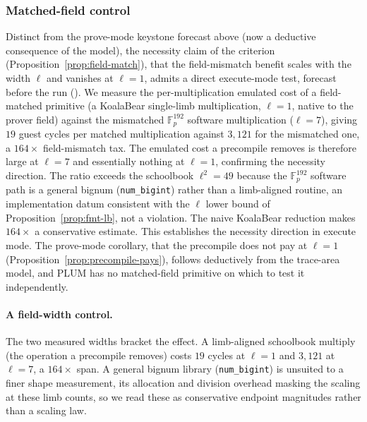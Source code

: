 \subsubsection{Matched-field control}
Distinct from the prove-mode keystone forecast above (now a deductive consequence of the model), the necessity claim of the criterion (Proposition~\ref{prop:field-match}), that the field-mismatch benefit scales with the width $\ell$ and vanishes at $\ell=1$, admits a direct execute-mode test, forecast before the run (). We measure the per-multiplication emulated cost of a field-matched primitive (a KoalaBear single-limb multiplication, $\ell=1$, native to the prover field) against the mismatched $\mathbb{F}_p^{192}$ software multiplication ($\ell=7$), giving $19$ guest cycles per matched multiplication against $3{,}121$ for the mismatched one, a $164\times$ field-mismatch tax. The emulated cost a precompile removes is therefore large at $\ell=7$ and essentially nothing at $\ell=1$, confirming the necessity direction. The ratio exceeds the schoolbook $\ell^2=49$ because the $\mathbb{F}_p^{192}$ software path is a general bignum (\texttt{num\_bigint}) rather than a limb-aligned routine, an implementation datum consistent with the $\ell$ lower bound of Proposition~\ref{prop:fmt-lb}, not a violation. The naive KoalaBear reduction makes $164\times$ a conservative estimate. This establishes the necessity direction in execute mode. The prove-mode corollary, that the precompile does not pay at $\ell=1$ (Proposition~\ref{prop:precompile-pays}), follows deductively from the trace-area model, and PLUM has no matched-field primitive on which to test it independently.

\paragraph{A field-width control.} The two measured widths bracket the effect. A
limb-aligned schoolbook multiply (the operation a precompile removes) costs $19$ cycles at $\ell=1$ and $3{,}121$ at $\ell=7$, a $164\times$ span. A general bignum library (\texttt{num\_bigint}) is unsuited to a finer shape measurement, its allocation and division overhead masking the scaling at these limb counts, so we read these as conservative endpoint magnitudes rather than a scaling law.


